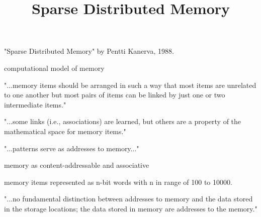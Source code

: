 \documentclass{article}
\begin{document}
\title{Sparse Distributed Memory}
\author{}
\date{}
\maketitle

"Sparse Distributed Memory" by Pentti Kanerva, 1988.

computational model of memory

"...memory items should be arranged in such a way that most items are unrelated to one another but most pairs of items can be linked by just one or two intermediate items."

"...some links (i.e., associations) are learned, but others are a property of the mathematical space for memory items."

"...patterns serve as addresses to memory..."

memory as content-addressable and associative

memory items represented as n-bit words with n in range of 100 to 10000.

"...no fundamental distinction between addresses to memory and the data stored in the storage locations; the data stored in memory are addresses to the memory."
\end{document}
